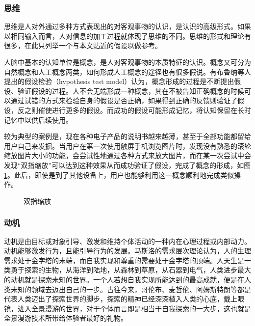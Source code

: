 \subsubsection{思维}
思维是人对外通过多种方式表现出的对客观事物的认识，是认识的高级形式。如果以相同输入而言，人对信息的加工过程就体现了思维的不同。思维的形式和理论有很多，在此只列举一个与本文贴近的假设以做参考。

人脑中基本的认知单位是概念，是人对客观事物的本质特征的认识。概念又可分为自然概念和人工概念两类，如何形成人工概念的途径也有很多假说。有布鲁纳等人提出的假设检验（hypothesis test model）认为，概念形成的过程是不断提出假设、验证假设的过程。人不会无端形成一种概念，其在不被告知正确概念的时候可以通过试错的方式来检验自身的假设是否正确，如果得到正确的反馈则验证了假设，反之则催使进行更多的假设。而成功的假设可能形成记忆，将认知保留在长时记忆中以供后续使用。

较为典型的案例是，现在各种电子产品的说明书越来越薄，甚至于全部功能都留给用户自己来发掘。当用户在第一次使用触屏手机浏览图片时，发现没有熟悉的滚轮缩放图片大小的功能，会尝试性地通过各种方式来放大图片，而在某一次尝试中会发现“双指缩放”可以达到这种效果从而成功验证了假设，完成了概念的形成，如图\ref{fig:stretch}。此后，即使是到了其他设备上，用户也能够利用这一概念顺利地完成类似操作。

\begin{figure}[htp]
\centering
{}
\caption{双指缩放}
\label{fig:stretch}
\end{figure}

\subsubsection{动机}
动机是由目标或对象引导、激发和维持个体活动的一种内在心理过程或内部动力。动机能够激发行为，且能引导行为的发展。马斯洛的需求层次理论认为，人的生理需求处于金字塔的末端，而自我实现和尊重的需要处于金字塔的顶端。人天生是一类勇于探索的生物，从海洋到陆地，从森林到草原，从石器到电气，人类进步最大的动机就是探索未知的世界。一个人若想自我实现所能达到的最高成就，便是在人类未知的领域去迈出自己的一步。古往今来，哥伦布、麦哲伦、阿姆斯特朗等都是代表人类迈出了探索世界的脚步，探索的精神已经深深植入人类的心底，戴上眼镜，进入全景漫游的世界，对于个体而言即是相当于自我探索的一大步，这也就是全景漫游技术所带给体验者最好的礼物。
